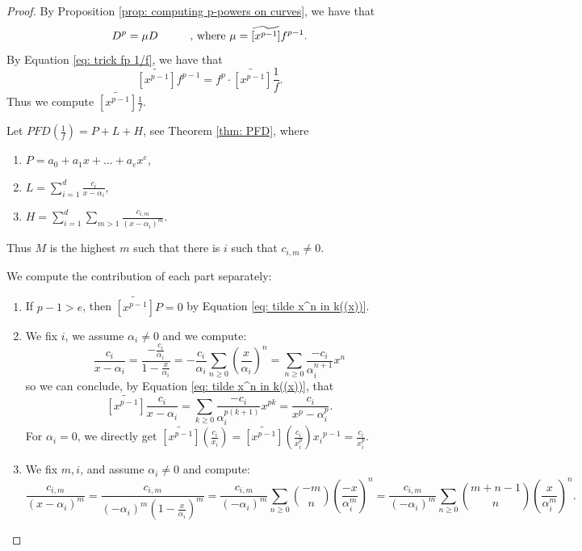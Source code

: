 \documentclass{amsart}
\theoremstyle{definition}
\begin{document}
\begin{proof}
    By Proposition \ref{prop: computing p-powers on curves}, we have that
    \[
    D^p= \mu D \hspace{1 cm} \text{, where } \mu=\widetilde{[x^{p-1}]}f^{p-1}.
    \]  
    By Equation \ref{eq: trick fp 1/f}, we have that
    \[
    \widetilde{[x^{p-1}]}f^{p-1}=f^p \cdot \widetilde{[x^{p-1}]}\frac{1}{f}.
    \]
    Thus we compute $\widetilde{[x^{p-1}]}\frac{1}{f}$.

    Let $PFD(\frac{1}{f})=P+L+H$, see Theorem \ref{thm: PFD}, where
    \begin{enumerate}
        \item $P=a_0+a_1x+\ldots+a_e x^e$,
        \item $L=\sum_{i=1}^d\frac{c_i}{x-\alpha_i}$,
        \item $H=\sum_{i=1}^d\sum_{m>1}\frac{c_{i,m}}{(x-\alpha_i)^m}$.
    \end{enumerate}
    Thus $M$ is the highest $m$ such that there is $i$ such that $c_{i,m}\ne 0$.
    
    We compute the contribution of each part separately:
    \begin{enumerate}
        \item If $p-1>e$, then $\widetilde{[x^{p-1}]}P=0$ by Equation \ref{eq: tilde x^n in k((x))}.
        \item We fix $i$, we assume $\alpha_i\ne 0$ and we compute:
        \[
        \frac{c_i}{x-\alpha_i}=\frac{-\frac{c_i}{\alpha_i}}{1-\frac{x}{\alpha_i}}=-\frac{c_i}{\alpha_i}\sum_{n\ge 0}\left(\frac{x}{\alpha_i}\right)^n=\sum_{n\ge 0}\frac{-c_i}{\alpha_i^{n+1}}x^n
        \]
        so we can conclude, by Equation \ref{eq: tilde x^n in k((x))}, that
        \[
        \widetilde{[x^{p-1}]}\frac{c_i}{x-\alpha_i}=\sum_{k\ge 0}\frac{-c_i}{\alpha_i^{p(k+1)}}x^{pk}=\frac{c_i}{x^p-\alpha_i^p}.
        \]
        For $\alpha_i=0$, we directly get $\widetilde{[x^{p-1}]}(\frac{c_i}{x_i})=\widetilde{[x^{p-1}]}(\frac{c_i}{x_i^p}){x_i}^{p-1}=\frac{c_i}{x_i^p}$.
        
        \item We fix $m,i$, and assume $\alpha_i\ne 0$ and compute:
        \[
        \frac{c_{i,m}}{(x-\alpha_i)^m}=\frac{c_{i,m}}{(-\alpha_i)^m(1-\frac{x}{\alpha_i})^m}=\frac{c_{i,m}}{(-\alpha_i)^m}\sum_{n\ge 0} \binom{-m}{ n}\left(\frac{-x}{\alpha_i^m}\right)^n=\frac{c_{i,m}}{(-\alpha_i)^m}\sum_{n\ge 0} \binom{m+n-1}{ n}\left(\frac{x}{\alpha_i^m}\right)^n.
        \]


\end{enumerate}
\end{proof}
\end{document}
